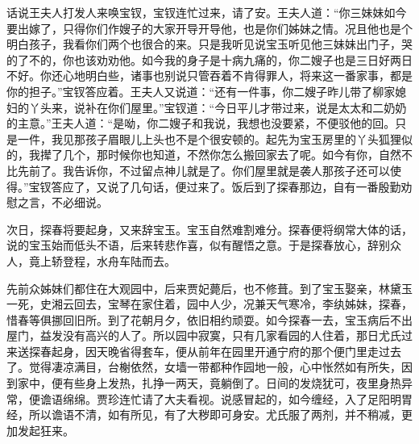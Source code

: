 


\begin{parag}
    话说王夫人打发人来唤宝钗，宝钗连忙过来，请了安。王夫人道：“你三妹妹如今要出嫁了，只得你们作嫂子的大家开导开导他，也是你们姊妹之情。况且他也是个明白孩子，我看你们两个也很合的来。只是我听见说宝玉听见他三妹妹出门子，哭的了不的，你也该劝劝他。如今我的身子是十病九痛的，你二嫂子也是三日好两日不好。你还心地明白些，诸事也别说只管吞着不肯得罪人，将来这一番家事，都是你的担子。”宝钗答应着。王夫人又说道：“还有一件事，你二嫂子昨儿带了柳家媳妇的丫头来，说补在你们屋里。”宝钗道：“今日平儿才带过来，说是太太和二奶奶的主意。”王夫人道：“是呦，你二嫂子和我说，我想也没要紧，不便驳他的回。只是一件，我见那孩子眉眼儿上头也不是个很安顿的。起先为宝玉房里的丫头狐狸似的，我撵了几个，那时候你也知道，不然你怎么搬回家去了呢。如今有你，自然不比先前了。我告诉你，不过留点神儿就是了。你们屋里就是袭人那孩子还可以使得。”宝钗答应了，又说了几句话，便过来了。饭后到了探春那边，自有一番殷勤劝慰之言，不必细说。
\end{parag}


\begin{parag}
    次日，探春将要起身，又来辞宝玉。宝玉自然难割难分。探春便将纲常大体的话，说的宝玉始而低头不语，后来转悲作喜，似有醒悟之意。于是探春放心，辞别众人，竟上轿登程，水舟车陆而去。
\end{parag}


\begin{parag}
    先前众姊妹们都住在大观园中，后来贾妃薨后，也不修葺。到了宝玉娶亲，林黛玉一死，史湘云回去，宝琴在家住着，园中人少，况兼天气寒冷，李纨姊妹，探春，惜春等俱挪回旧所。到了花朝月夕，依旧相约顽耍。如今探春一去，宝玉病后不出屋门，益发没有高兴的人了。所以园中寂寞，只有几家看园的人住着，那日尤氏过来送探春起身，因天晚省得套车，便从前年在园里开通宁府的那个便门里走过去了。觉得凄凉满目，台榭依然，女墙一带都种作园地一般，心中怅然如有所失，因到家中，便有些身上发热，扎挣一两天，竟躺倒了。日间的发烧犹可，夜里身热异常，便谵语绵绵。贾珍连忙请了大夫看视。说感冒起的，如今缠经，入了足阳明胃经，所以谵语不清，如有所见，有了大秽即可身安。尤氏服了两剂，并不稍减，更加发起狂来。
\end{parag}


